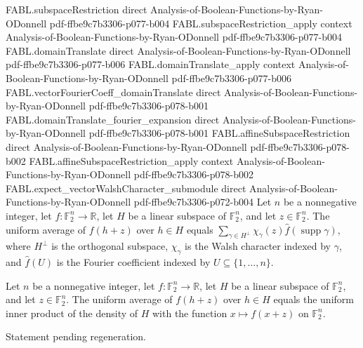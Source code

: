 \begin{theorem}
\proofstep
  {FABL.subspaceRestriction}
  {direct}
  {Analysis-of-Boolean-Functions-by-Ryan-ODonnell}
  {pdf-ffbe9c7b3306-p077-b004}
\proofstep
  {FABL.subspaceRestriction_apply}
  {context}
  {Analysis-of-Boolean-Functions-by-Ryan-ODonnell}
  {pdf-ffbe9c7b3306-p077-b004}
\proofstep
  {FABL.domainTranslate}
  {direct}
  {Analysis-of-Boolean-Functions-by-Ryan-ODonnell}
  {pdf-ffbe9c7b3306-p077-b006}
\proofstep
  {FABL.domainTranslate_apply}
  {context}
  {Analysis-of-Boolean-Functions-by-Ryan-ODonnell}
  {pdf-ffbe9c7b3306-p077-b006}
\proofstep
  {FABL.vectorFourierCoeff_domainTranslate}
  {direct}
  {Analysis-of-Boolean-Functions-by-Ryan-ODonnell}
  {pdf-ffbe9c7b3306-p078-b001}
\proofstep
  {FABL.domainTranslate_fourier_expansion}
  {direct}
  {Analysis-of-Boolean-Functions-by-Ryan-ODonnell}
  {pdf-ffbe9c7b3306-p078-b001}
\proofstep
  {FABL.affineSubspaceRestriction}
  {direct}
  {Analysis-of-Boolean-Functions-by-Ryan-ODonnell}
  {pdf-ffbe9c7b3306-p078-b002}
\proofstep
  {FABL.affineSubspaceRestriction_apply}
  {context}
  {Analysis-of-Boolean-Functions-by-Ryan-ODonnell}
  {pdf-ffbe9c7b3306-p078-b002}
\proofstep
  {FABL.expect_vectorWalshCharacter_submodule}
  {direct}
  {Analysis-of-Boolean-Functions-by-Ryan-ODonnell}
  {pdf-ffbe9c7b3306-p072-b004}
Let $n$ be a nonnegative integer, let $f:\mathbb{F}_2^n\to\mathbb{R}$, let $H$ be a
linear subspace of $\mathbb{F}_2^n$, and let $z\in\mathbb{F}_2^n$. The uniform average
of $f(h+z)$ over $h\in H$ equals $\sum_{\gamma\in H^\perp}\chi_\gamma(z)\widehat
f(\operatorname{supp}\gamma)$, where $H^\perp$ is the orthogonal subspace, $\chi_\gamma$
is the Walsh character indexed by $\gamma$, and $\widehat f(U)$ is the Fourier
coefficient indexed by $U\subseteq\{1,\ldots,n\}$.
\end{theorem}

\begin{theorem}
\label{FABL.expect_affineSubspaceRestriction_eq_uniformInner}
\leanok
{}
Let $n$ be a nonnegative integer, let $f:\mathbb{F}_2^n\to\mathbb{R}$, let $H$ be a
linear subspace of $\mathbb{F}_2^n$, and let $z\in\mathbb{F}_2^n$. The uniform average
of $f(h+z)$ over $h\in H$ equals the uniform inner product of the density of $H$ with
the function $x\mapsto f(x+z)$ on $\mathbb{F}_2^n$.
\end{theorem}

\begin{theorem}
\label{FABL.poissonSummationFormula}
\leanok
{}
Statement pending regeneration.
\end{theorem}
